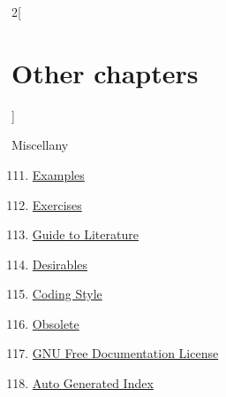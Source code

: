 \begin{multicols}{2}[\section{Other chapters}]
\begin{enumerate}
\end{enumerate}
Miscellany
\begin{enumerate}
\setcounter{enumi}{110}
\item \hyperref[examples-section-phantom]{Examples}
\item \hyperref[exercises-section-phantom]{Exercises}
\item \hyperref[guide-section-phantom]{Guide to Literature}
\item \hyperref[desirables-section-phantom]{Desirables}
\item \hyperref[coding-section-phantom]{Coding Style}
\item \hyperref[obsolete-section-phantom]{Obsolete}
\item \hyperref[fdl-section-phantom]{GNU Free Documentation License}
\item \hyperref[index-section-phantom]{Auto Generated Index}
\end{enumerate}
\end{multicols}
